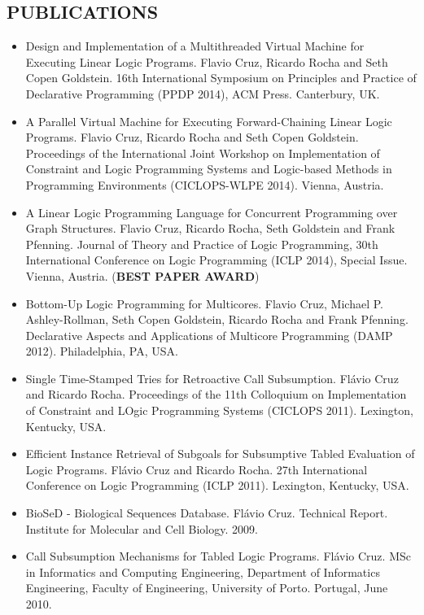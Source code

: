 \documentclass[margin]{res}
\begin{document}
\begin{resume}
\section{PUBLICATIONS}
   \begin{itemize}
      \item Design and Implementation of a Multithreaded Virtual Machine for Executing Linear Logic Programs. Flavio Cruz, Ricardo Rocha and Seth Copen Goldstein. 16th International Symposium on Principles and Practice of Declarative Programming (PPDP 2014), ACM Press. Canterbury, UK.
      \item A Parallel Virtual Machine for Executing Forward-Chaining Linear Logic Programs. Flavio Cruz, Ricardo Rocha and Seth Copen Goldstein. Proceedings of the International Joint Workshop on Implementation of Constraint and Logic Programming Systems and Logic-based Methods in Programming Environments (CICLOPS-WLPE 2014). Vienna, Austria.
      \item A Linear Logic Programming Language for Concurrent Programming over Graph Structures. Flavio Cruz, Ricardo Rocha, Seth Goldstein and Frank Pfenning. Journal of Theory and Practice of Logic Programming, 30th International Conference on Logic Programming (ICLP 2014), Special Issue. Vienna, Austria. (\textbf{BEST PAPER AWARD})
      \item Bottom-Up Logic Programming for Multicores. Flavio Cruz, Michael P. Ashley-Rollman, Seth Copen Goldstein, Ricardo Rocha and Frank Pfenning. Declarative Aspects and Applications of Multicore Programming (DAMP 2012). Philadelphia, PA, USA.
      \item Single Time-Stamped Tries for Retroactive Call Subsumption. Flávio Cruz and Ricardo Rocha. Proceedings of the 11th Colloquium on Implementation of Constraint and LOgic Programming Systems (CICLOPS 2011). Lexington, Kentucky, USA.
      \item Efficient Instance Retrieval of Subgoals for Subsumptive Tabled Evaluation of Logic Programs. Flávio Cruz and Ricardo Rocha. 27th International Conference on Logic Programming (ICLP 2011). Lexington, Kentucky, USA.
      \item BioSeD - Biological Sequences Database. Flávio Cruz. Technical Report. Institute for Molecular and Cell Biology. 2009.
      \item Call Subsumption Mechanisms for Tabled Logic Programs. Flávio Cruz. MSc in Informatics and Computing Engineering, Department of Informatics Engineering, Faculty of Engineering, University of Porto. Portugal, June 2010.

\end{itemize}
\end{resume}
\end{document}
